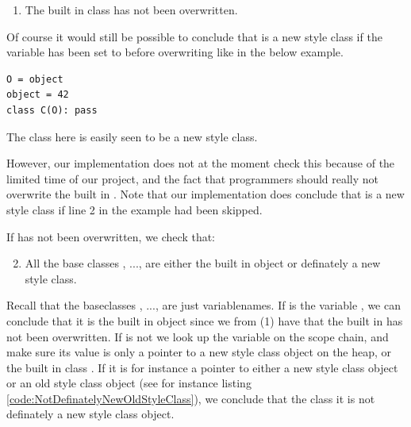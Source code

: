 \begin{enumerate}
	\item The built in class  has not been overwritten.
\end{enumerate}

Of course it would still be possible to conclude that  is a new style class if the variable  has been set to  before overwriting  like in the below example.

\begin{listing}[H]
	\begin{verbatim}
O = object
object = 42
class C(O): pass
	\end{verbatim}
	\caption{The class  here is easily seen to be a new style class.}\label{code:ClassOverwrittenObject}
\end{listing}

However, our implementation does not at the moment check this because of the limited time of our project, and the fact that programmers should really not overwrite the built in . Note that our implementation does conclude that  is a new style class if line 2 in the example had been skipped.

If  has not been overwritten, we check that:

\begin{enumerate}
\setcounter{enumi}{1}
	\item All the base classes , ...,  are either the built in object or definately a new style class.
\end{enumerate}

Recall that the baseclasses , ...,  are just variablenames. If  is the variable , we can conclude that it is the built in object since we from (1) have that the built in  has not been overwritten. If  is not  we look up the variable on the scope chain, and make sure its value is only a pointer to a new style class object on the heap, or the built in class . If it is for instance a pointer to either a new style class object or an old style class object (see for instance listing \ref{code:NotDefinatelyNewOldStyleClass}), we conclude that the class  it is not definately a new style class object.

